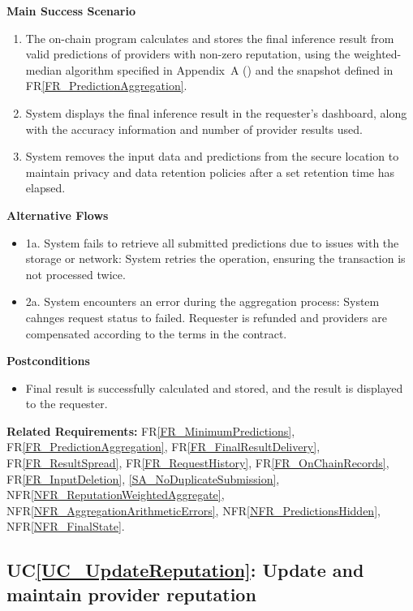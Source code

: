 \documentclass[12pt]{article}
\newcounter{ucnum} %
\newcommand{\ucref}[1]{UC\ref{#1}}
\newcommand{\rref}[1]{FR\ref{#1}}
\newcommand{\nfrref}[1]{NFR\ref{#1}}
\begin{document}
\textbf{Main Success Scenario}
\begin{enumerate}
\item The on-chain program calculates and stores the final inference result
from valid predictions of providers with non-zero reputation, using the
weighted-median algorithm specified in Appendix~A
() and the snapshot defined in
\rref{FR_PredictionAggregation}.
\item System displays the final inference result in the requester's dashboard, along with the accuracy information and number of provider results used.
\item System removes the input data and predictions from the secure location to maintain privacy and data retention policies after a set retention time has elapsed.
\end{enumerate}

\textbf{Alternative Flows}
\begin{itemize}
\item 1a. System fails to retrieve all submitted predictions due to issues with the storage or network: System retries the operation, ensuring the transaction is not processed twice.
\item 2a. System encounters an error during the aggregation process: System cahnges request status to failed. Requester is refunded and providers are compensated according to the terms in the contract.
\end{itemize}

\textbf{Postconditions}
\begin{itemize}
\item Final result is successfully calculated and stored, and the result is displayed to the requester.
\end{itemize}

\textbf{Related Requirements:} \rref{FR_MinimumPredictions}, \rref{FR_PredictionAggregation}, \rref{FR_FinalResultDelivery}, \rref{FR_ResultSpread}, \rref{FR_RequestHistory}, \rref{FR_OnChainRecords}, \rref{FR_InputDeletion}, \ref{SA_NoDuplicateSubmission}, \nfrref{NFR_ReputationWeightedAggregate}, \nfrref{NFR_AggregationArithmeticErrors}, \nfrref{NFR_PredictionsHidden}, \nfrref{NFR_FinalState}.

 \label{UC_UpdateReputation}
\subsection{\ucref{UC_UpdateReputation}: Update and maintain provider reputation}
\end{document}
